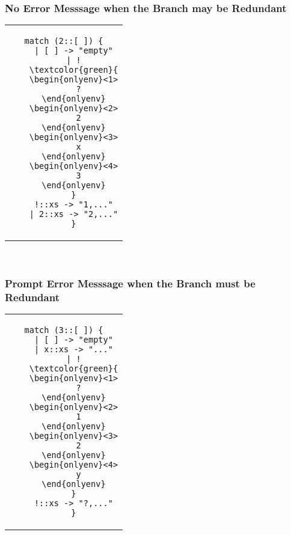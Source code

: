 \documentclass[notheorems]{beamer}
\theoremstyle{slplain}
\numberwithin{thm}{section}
\begin{document}
\begin{frame}[fragile]
  \frametitle{No Error Messsage when the Branch may be Redundant}
\begin{center}
\begin{tabular}{c}
  \begin{lstlisting}[escapechar=!]
    match (2::[ ]) {
    | [ ] -> "empty"
    | !
    \textcolor{green}{
    \begin{onlyenv}<1>
      ?
    \end{onlyenv}
    \begin{onlyenv}<2>
      2
    \end{onlyenv}
    \begin{onlyenv}<3>
      x
    \end{onlyenv}
    \begin{onlyenv}<4>
      3
    \end{onlyenv}
    }
    !::xs -> "1,..."
    | 2::xs -> "2,..."
    }
  \end{lstlisting}
\end{tabular}
\\
\vspace{1cm}
\end{center}
\end{frame}

\begin{frame}[fragile]
  \frametitle{Prompt Error Messsage when the Branch must be Redundant}
\begin{center}
\begin{tabular}{c}
  \begin{lstlisting}[escapechar=!]
    match (3::[ ]) {
    | [ ] -> "empty"
    | x::xs -> "..."
    | !
    \textcolor{green}{
    \begin{onlyenv}<1>
      ?
    \end{onlyenv}
    \begin{onlyenv}<2>
      1
    \end{onlyenv}
    \begin{onlyenv}<3>
      2
    \end{onlyenv}
    \begin{onlyenv}<4>
      y
    \end{onlyenv}
    }
    !::xs -> "?,..."
    }
  \end{lstlisting}
\end{tabular}
\\
\vspace{1cm}
\end{center}
\end{frame}
\end{document}
